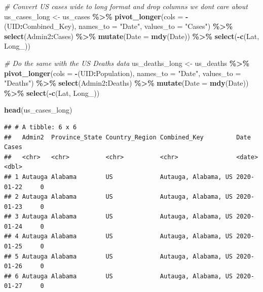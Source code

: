 \documentclass[
]{article}
\newenvironment{Shaded}{\begin{snugshade}}{\end{snugshade}}
\newcommand{\AttributeTok}[1]{\textcolor[rgb]{0.13,0.29,0.53}{#1}}
\newcommand{\CommentTok}[1]{\textcolor[rgb]{0.56,0.35,0.01}{\textit{#1}}}
\newcommand{\FunctionTok}[1]{\textcolor[rgb]{0.13,0.29,0.53}{\textbf{#1}}}
\newcommand{\NormalTok}[1]{#1}
\newcommand{\OtherTok}[1]{\textcolor[rgb]{0.56,0.35,0.01}{#1}}
\newcommand{\SpecialCharTok}[1]{\textcolor[rgb]{0.81,0.36,0.00}{\textbf{#1}}}
\newcommand{\StringTok}[1]{\textcolor[rgb]{0.31,0.60,0.02}{#1}}
\begin{document}
\begin{Shaded}
\begin{Highlighting}[]
\CommentTok{\# Convert US cases wide to long format and drop columns we don\textquotesingle{}t care about}
\NormalTok{us\_cases\_long }\OtherTok{\textless{}{-}}\NormalTok{ us\_cases }\SpecialCharTok{\%\textgreater{}\%}
  \FunctionTok{pivot\_longer}\NormalTok{(}\AttributeTok{cols =} \SpecialCharTok{{-}}\NormalTok{(UID}\SpecialCharTok{:}\NormalTok{Combined\_Key), }
               \AttributeTok{names\_to =} \StringTok{"Date"}\NormalTok{, }\AttributeTok{values\_to =} \StringTok{"Cases"}\NormalTok{) }\SpecialCharTok{\%\textgreater{}\%}
  \FunctionTok{select}\NormalTok{(Admin2}\SpecialCharTok{:}\NormalTok{Cases) }\SpecialCharTok{\%\textgreater{}\%}
  \FunctionTok{mutate}\NormalTok{(}\AttributeTok{Date =} \FunctionTok{mdy}\NormalTok{(Date)) }\SpecialCharTok{\%\textgreater{}\%}
  \FunctionTok{select}\NormalTok{(}\SpecialCharTok{{-}}\FunctionTok{c}\NormalTok{(Lat, Long\_))}

\CommentTok{\# Do the same with the US Deaths data}
\NormalTok{us\_deaths\_long }\OtherTok{\textless{}{-}}\NormalTok{ us\_deaths }\SpecialCharTok{\%\textgreater{}\%}
  \FunctionTok{pivot\_longer}\NormalTok{(}\AttributeTok{cols =} \SpecialCharTok{{-}}\NormalTok{(UID}\SpecialCharTok{:}\NormalTok{Population),}
               \AttributeTok{names\_to =} \StringTok{"Date"}\NormalTok{, }\AttributeTok{values\_to =} \StringTok{"Deaths"}\NormalTok{) }\SpecialCharTok{\%\textgreater{}\%}
  \FunctionTok{select}\NormalTok{(Admin2}\SpecialCharTok{:}\NormalTok{Deaths) }\SpecialCharTok{\%\textgreater{}\%}
  \FunctionTok{mutate}\NormalTok{(}\AttributeTok{Date =} \FunctionTok{mdy}\NormalTok{(Date)) }\SpecialCharTok{\%\textgreater{}\%}
  \FunctionTok{select}\NormalTok{(}\SpecialCharTok{{-}}\FunctionTok{c}\NormalTok{(Lat, Long\_))}

\FunctionTok{head}\NormalTok{(us\_cases\_long)}
\end{Highlighting}
\end{Shaded}

\begin{verbatim}
## # A tibble: 6 x 6
##   Admin2  Province_State Country_Region Combined_Key         Date       Cases
##   <chr>   <chr>          <chr>          <chr>                <date>     <dbl>
## 1 Autauga Alabama        US             Autauga, Alabama, US 2020-01-22     0
## 2 Autauga Alabama        US             Autauga, Alabama, US 2020-01-23     0
## 3 Autauga Alabama        US             Autauga, Alabama, US 2020-01-24     0
## 4 Autauga Alabama        US             Autauga, Alabama, US 2020-01-25     0
## 5 Autauga Alabama        US             Autauga, Alabama, US 2020-01-26     0
## 6 Autauga Alabama        US             Autauga, Alabama, US 2020-01-27     0
\end{verbatim}
\end{document}
